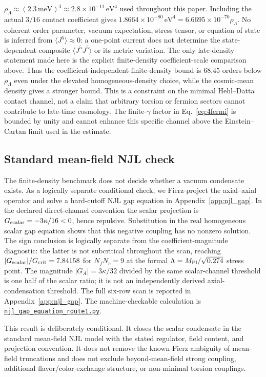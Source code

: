 \documentclass[aps,prd,twocolumn,superscriptaddress,showpacs,preprintnumbers,nofootinbib,longbibliography,floatfix]{revtex4-2}
\newcommand{\artifactnamed}[2]{\href{https://github.com/Hubify-Projects/bigbounce/blob/main/#1}{\nolinkurl{#2}}}
\begin{document}
$\rho_\Lambda\approx (2.3\,\text{meV})^4 \approx 2.8\times 10^{-11}\,\text{eV}^4$
used throughout this paper.  Including the actual $3/16$ contact coefficient
gives $1.8664\times10^{-80}\,\text{eV}^4=6.6695\times10^{-70}\rho_\Lambda$.
No coherent order parameter, vacuum expectation, stress tensor, or equation of
state is inferred from $\langle J^5\rangle\approx0$: a one-point current does
not determine the state-dependent composite $\langle J^5J^5\rangle$ or its
metric variation.  The only late-density statement made here is the explicit
finite-density coefficient-scale comparison above.
Thus the coefficient-independent finite-density bound is $68.45$ orders below
$\rho_\Lambda$ even under the elevated homogeneous-density choice, while the
cosmic-mean density gives a stronger bound.  This is a constraint on the
minimal Hehl--Datta contact channel, not a claim that arbitrary torsion or
fermion sectors cannot contribute to late-time cosmology.  The finite-$\gamma$
factor in Eq.~\eqref{eq:4fermi} is bounded by unity and cannot enhance this
specific channel above the Einstein--Cartan limit used in the estimate.

\subsection{Standard mean-field NJL check}

The finite-density benchmark does not decide whether a vacuum condensate
exists.  As a logically separate conditional check, we Fierz-project the
axial--axial operator and solve a
hard-cutoff NJL gap equation in Appendix~\ref{app:njl_gap}.  In the declared
direct-channel convention the scalar projection is
$G_{\rm scalar}=-3\kappa/16<0$, hence repulsive.  Substitution in the real
homogeneous scalar gap equation shows that this negative coupling has no
nonzero solution.  The sign conclusion is logically separate from the
coefficient-magnitude diagnostic: the latter is not subcritical throughout
the scan, reaching $|G_{\rm scalar}|/G_{\rm crit}=7.84158$ for
$N_fN_c=9$ at the formal $\Lambda=M_{\rm Pl}/\sqrt{0.274}$ stress point.
The magnitude $|G_A|=3\kappa/32$ divided by the same scalar-channel threshold
is one half of the scalar ratio; it is not an independently derived
axial-condensation threshold.  The full six-row scan is reported in
Appendix~\ref{app:njl_gap}.
The machine-checkable calculation is
\artifactnamed{arxiv/scripts/njl_gap_equation_route1.py}{njl_gap_equation_route1.py}.

This result is deliberately conditional.  It closes the scalar condensate in
the standard mean-field NJL model with the stated regulator, field content,
and projection convention.  It does not remove the known Fierz ambiguity of
mean-field truncations and does not exclude beyond-mean-field strong coupling,
additional flavor/color exchange structure, or non-minimal torsion couplings.
\end{document}
